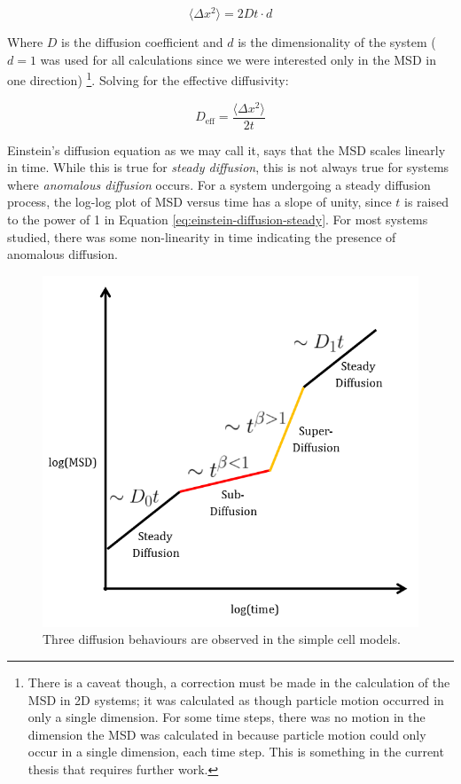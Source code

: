 	\begin{equation}
	\label{eq:einstein-diffusion-steady}
		\langle \Delta x^2 \rangle = 2Dt \cdot d
	\end{equation}
		
	Where $ D $ is the diffusion coefficient and $ d $ is the dimensionality of the system ($ d = 1 $ was used for all calculations since we were interested only in the MSD in one direction) \footnote{There is a caveat though, a correction must be made in the calculation of the MSD in 2D systems; it was calculated as though particle motion occurred in only a single dimension. For some time steps, there was no motion in the dimension the MSD was calculated in because particle motion could only occur in a single dimension, each time step. This is something in the current thesis that requires further work.}. Solving for the effective diffusivity:
	
	\begin{equation}
		D_\textrm{eff} = \dfrac{\langle \Delta x^2 \rangle}{2t}
	\end{equation}	
	
	Einstein's diffusion equation as we may call it, says that the MSD scales linearly in time. While this is true for \textsl{steady diffusion}, this is not always true for systems where \textsl{anomalous diffusion} occurs. For a system undergoing a steady diffusion process, the log-log plot of MSD versus time has a slope of unity, since $ t $ is raised to the power of 1 in Equation \ref{eq:einstein-diffusion-steady}. For most systems studied, there was some non-linearity in time indicating the presence of anomalous diffusion. 
		
	\begin{figure}[h]
		\centering
		\includegraphics[width=0.7\linewidth]{../images/diffusion-regime}
		\caption{Three diffusion behaviours are observed in the simple cell models.}
		\label{fig:diffusion-regime}
	\end{figure}

